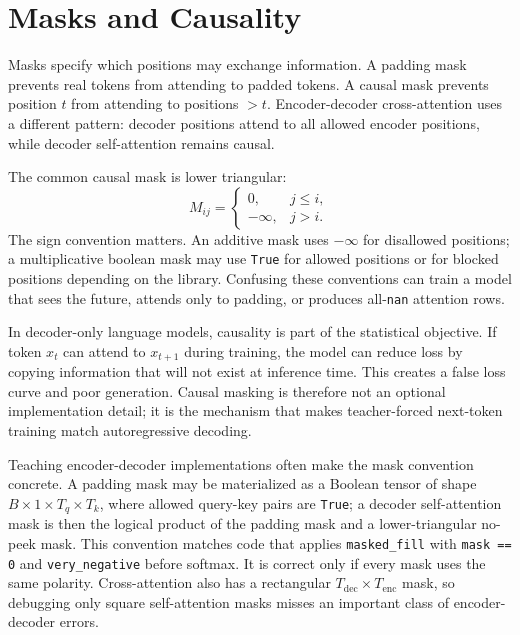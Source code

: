\section{Masks and Causality}
\label{sec:masks-causality}

Masks specify which positions may exchange information. A padding mask prevents real tokens from attending to padded tokens. A causal mask prevents position $t$ from attending to positions $>t$. Encoder-decoder cross-attention uses a different pattern: decoder positions attend to all allowed encoder positions, while decoder self-attention remains causal.

The common causal mask is lower triangular:
\begin{equation}
  M_{ij} =
  \begin{cases}
  0, & j \leq i,\\
  -\infty, & j > i.
  \end{cases}
\end{equation}
The sign convention matters. An additive mask uses $-\infty$ for disallowed positions; a multiplicative boolean mask may use \texttt{True} for allowed positions or for blocked positions depending on the library. Confusing these conventions can train a model that sees the future, attends only to padding, or produces all-\texttt{nan} attention rows.

In decoder-only language models, causality is part of the statistical objective. If token $x_t$ can attend to $x_{t+1}$ during training, the model can reduce loss by copying information that will not exist at inference time. This creates a false loss curve and poor generation. Causal masking is therefore not an optional implementation detail; it is the mechanism that makes teacher-forced next-token training match autoregressive decoding.

Teaching encoder-decoder implementations often make the mask convention concrete. A padding mask may be materialized as a Boolean tensor of shape $B \times 1 \times T_q \times T_k$, where allowed query-key pairs are \texttt{True}; a decoder self-attention mask is then the logical product of the padding mask and a lower-triangular no-peek mask. This convention matches code that applies \texttt{masked\_fill} with \texttt{mask == 0} and \texttt{very\_negative} before softmax. It is correct only if every mask uses the same polarity. Cross-attention also has a rectangular $T_{\mathrm{dec}}\times T_{\mathrm{enc}}$ mask, so debugging only square self-attention masks misses an important class of encoder-decoder errors.

